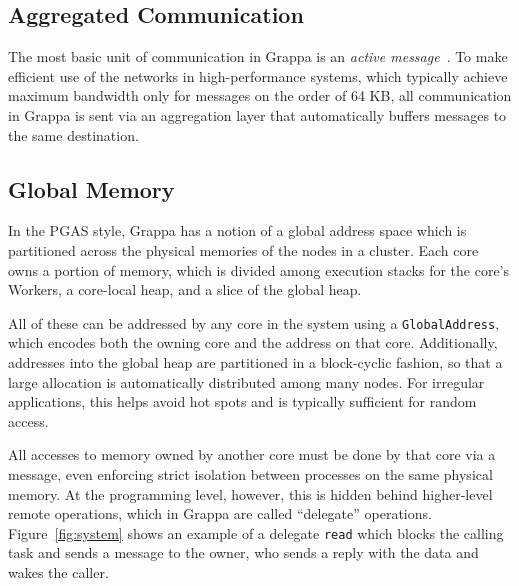 \subsection{Aggregated Communication}
The most basic unit of communication in Grappa is an \emph{active message}~\cite{vonEicken92}.
To make efficient use of the networks in high-performance systems, which typically achieve maximum bandwidth only for messages on the order of 64 KB, all communication in Grappa is sent via an aggregation layer that automatically buffers messages to the same destination.

\subsection{Global Memory}
In the PGAS style, Grappa has a notion of a global address space which is partitioned across the physical memories of the nodes in a cluster. Each core owns a portion of memory, which is divided among execution stacks for the core's Workers, a core-local heap, and a slice of the global heap.

All of these can be addressed by any core in the system using a \texttt{GlobalAddress}, which encodes both the owning core and the address on that core. Additionally, addresses into the global heap are partitioned in a block-cyclic fashion, so that a large allocation is automatically distributed among many nodes. For irregular applications, this helps avoid hot spots and is typically sufficient for random access.

All accesses to memory owned by another core must be done by that core via a message, even enforcing strict isolation between processes on the same physical memory. At the programming level, however, this is hidden behind higher-level remote operations, which in Grappa are called ``delegate'' operations. Figure~\ref{fig:system} shows an example of a delegate \texttt{read} which blocks the calling task and sends a message to the owner, who sends a reply with the data and wakes the caller.

